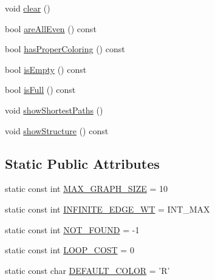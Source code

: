 \begin{DoxyCompactItemize}
void \hyperlink{class_weighted_graph_a26890ebf74d23821a6e4dbcf803b5002}{clear} ()
\item 
bool \hyperlink{class_weighted_graph_a03884e32b9e093b10e3a44add7eaa928}{are\-All\-Even} () const 
\item 
bool \hyperlink{class_weighted_graph_a60be8bab10a9142846093cb768855efd}{has\-Proper\-Coloring} () const 
\item 
bool \hyperlink{class_weighted_graph_a1c03a0f68447cf88fed97c2076501702}{is\-Empty} () const 
\item 
bool \hyperlink{class_weighted_graph_a22e56836e3967031a657cfa9ea5b9843}{is\-Full} () const 
\item 
void \hyperlink{class_weighted_graph_a8e6ea9adc87345052786eec67a5f9164}{show\-Shortest\-Paths} ()
\item 
void \hyperlink{class_weighted_graph_ad7f20a989073ea5401d504d944182347}{show\-Structure} () const 
\end{DoxyCompactItemize}
\subsection*{\-Static \-Public \-Attributes}
\begin{DoxyCompactItemize}
\item 
static const int \hyperlink{class_weighted_graph_af9b34017e5b494cd3aca2dbc8335fc3c}{\-M\-A\-X\-\_\-\-G\-R\-A\-P\-H\-\_\-\-S\-I\-Z\-E} = 10
\item 
static const int \hyperlink{class_weighted_graph_ab41b338adfc1ebc080cfca0e0b85de4b}{\-I\-N\-F\-I\-N\-I\-T\-E\-\_\-\-E\-D\-G\-E\-\_\-\-W\-T} = \-I\-N\-T\-\_\-\-M\-A\-X
\item 
static const int \hyperlink{class_weighted_graph_aff499d450cb315d42d5bcff949f53141}{\-N\-O\-T\-\_\-\-F\-O\-U\-N\-D} = -\/1
\item 
static const int \hyperlink{class_weighted_graph_abc512f95c7ebf26d8984bc686f0b7bd7}{\-L\-O\-O\-P\-\_\-\-C\-O\-S\-T} = 0
\item 
static const char \hyperlink{class_weighted_graph_ad1854c7cf163167c7cebe7a2f5ebe9d6}{\-D\-E\-F\-A\-U\-L\-T\-\_\-\-C\-O\-L\-O\-R} = '\-R'
\end{DoxyCompactItemize}
